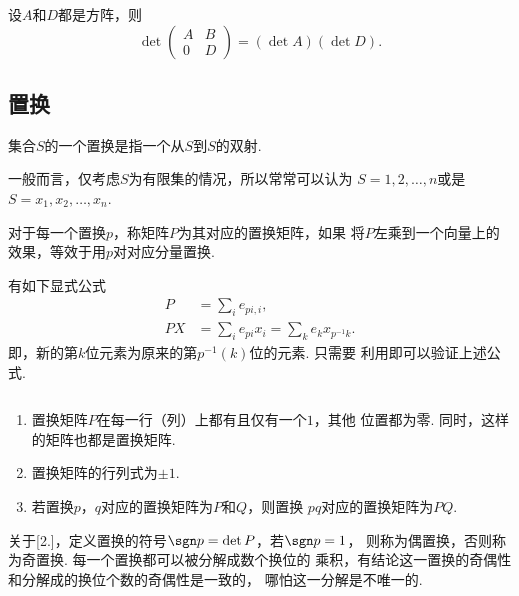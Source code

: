   \begin{lemma}[分块矩阵行列式]
    设$A$和$D$都是方阵，则
    \[
      \det \begin{pmatrix}
        A & B \\
        0 & D
      \end{pmatrix} = (\det A)(\det D).
    \]
  \end{lemma}

\subsection{置换}

  \begin{defi}
    集合$S$的一个置换是指一个从$S$到$S$的双射.
  \end{defi}
  \remark
    一般而言，仅考虑$S$为有限集的情况，所以常常可以认为
    $S={1,2,\dots,n}$或是$S={x_1,x_2,\dots,x_n}$.

  \begin{defi}[置换矩阵]
    对于每一个置换$p$，称矩阵$P$为其对应的置换矩阵，如果
    将$P$左乘到一个向量上的效果，等效于用$p$对对应分量置换.
  \end{defi}
  \remark
    有如下显式公式
    \[\begin{split}
      P &= \sum_i e_{pi,i}, \\
      PX &= \sum_i e_{pi}x_i = \sum_k e_k x_{p^{-1}k}.
    \end{split}\]
    即，新的第$k$位元素为原来的第$p^{-1}(k)$位的元素. 只需要
    利用即可以验证上述公式.

  \begin{pos}[置换矩阵]
    $\,$
    \begin{enumerate}
      \item 置换矩阵$P$在每一行（列）上都有且仅有一个$1$，其他
        位置都为零. 同时，这样的矩阵也都是置换矩阵.
      \item 置换矩阵的行列式为$\pm 1$.
      \item 若置换$p$，$q$对应的置换矩阵为$P$和$Q$，则置换
        $pq$对应的置换矩阵为$PQ$.
    \end{enumerate}
  \end{pos}
  \remark
    关于[2.]，定义置换的符号$\sgn p = \det P$，若$\sgn p = 1$，
    则称为偶置换，否则称为奇置换. 每一个置换都可以被分解成数个换位的
    乘积，有结论这一置换的奇偶性和分解成的换位个数的奇偶性是一致的，
    哪怕这一分解是不唯一的.
